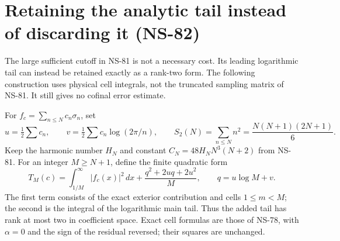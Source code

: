 \section{Retaining the analytic tail instead of discarding it (NS-82)}
\label{sec:ns82-tail-compression}

The large sufficient cutoff in NS-81 is not a necessary cost. Its leading
logarithmic tail can instead be retained exactly as a rank-two form. The
following construction uses physical cell integrals, not the truncated
sampling matrix of NS-81. It still gives no cofinal error estimate.

For $f_c=\sum_{n\leq N}c_n\sigma_n$, set
\[
 u=\tfrac12\sum c_n,\qquad
 v=\tfrac12\sum c_n\log(2\pi/n),\qquad
 S_2(N)=\sum_{n\leq N}n^2=\frac{N(N+1)(2N+1)}6.
\]
Keep the harmonic number $H_N$ and constant $C_N=48H_NN^3(N+2)$
from NS-81. For an integer $M\geq N+1$, define the finite quadratic form
\begin{equation}
 T_M(c)=\int_{1/M}^{\infty}|f_c(x)|^2\,dx
       +\frac{q^2+2uq+2u^2}{M},\qquad q=u\log M+v.
 \label{eq:ns82-comparator}
\end{equation}
The first term consists of the exact exterior contribution and cells
$1\leq m<M$; the second is the integral of the logarithmic main tail.
Thus the added tail has rank at most two in coefficient space. Exact
cell formulas are those of NS-78, with $\alpha=0$ and the sign of the
residual reversed; their squares are unchanged.

